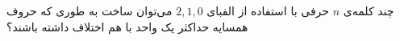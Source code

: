 \EXERCISE
چند کلمه‌ی
$n$
حرفی با استفاده از الفبای 
${2, 1, 0}$
می‌توان ساخت به طوری که حروف همسایه حداکثر یک واحد با هم اختلاف داشته باشند؟